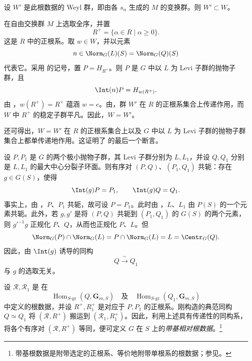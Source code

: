 
设 \(W'\) 是此根数据的 Weyl 群，即由各 \(s_\alpha\) 生成的 \(M\) 的变换群。则 \(W'\subset W\)。

在自由交换群 \(M\) 上选取全序，并置
\[
 R^+=\{\alpha\in R\mid\alpha\geq0\}.
\]
这是 \(R\) 中的正根系。取 \(w\in W\)，并以元素
\[
 n\in\Norm_G(L)(S)=\Norm_G(Q)(S)
\]
代表它。采用  的记号，置 \(P=H_{R^+}\)。则 \(P\) 是 \(G\) 中以 \(L\) 为 Levi 子群的抛物子群，且
\[
 \Int(n)P=H_{w(R^+)}.
\]
由 ，\(w(R^+)=R^+\) 蕴涵 \(w=e\)。由，群 \(W'\) 在 \(R\) 的正根系集合上传递作用，而 \(W\) 中 \(R^+\) 的稳定子群平凡。因此，\(W=W'\)。

还可得出，\(W=W'\) 在 \(R\) 的正根系集合上以及 \(G\) 中以 \(L\) 为 Levi 子群的抛物子群集合上都单传递地作用。这证明了  的最后一个断言。
\SGAQED



设 \(P,P_1\) 是 \(G\) 的两个极小抛物子群，其 Levi 子群分别为 \(L,L_1\)，并设 \(Q,Q_1\) 分别是 \(L,L_1\) 的最大中心分裂子环面。则有序对 \((P,Q)\)、\((P_1,Q_1)\) 共轭：存在 \(g\in G(S)\)，使得
\[
 \Int(g)P=P_1,\qquad \Int(g)Q=Q_1.
\]
事实上，由 ，\(P\)、\(P_1\) 共轭，故可设 \(P=P_1\)。此时由 ，\(L\)、\(L_1\) 由 \(P(S)\) 的一个元素共轭。此外，若 \(g,g'\) 是将 \((P,Q)\) 共轭到 \((P_1,Q_1)\) 的 \(G(S)\) 的两个元素，则 \(g'^{-1}g\) 正规化 \(P\)、\(Q\)，从而也正规化 \(P\)、\(L\)。但
\[
 \Norm_G(P)\cap\Norm_G(L)
 =P\cap\Norm_G(L)
 =L
 =\Centr_G(Q).
\]
因此，由 \(\Int(g)\) 诱导的同构
\[
 Q\xrightarrow{\ \sim\ }Q_1
\]
与 \(g\) 的选取无关。

设 \(\mathcal R,\mathcal R_1\) 是  在
\[
 \operatorname{Hom}_{S\text{-}\mathrm{gr}}(Q,\mathbf G_{m,S})
 \quad\text{及}\quad
 \operatorname{Hom}_{S\text{-}\mathrm{gr}}(Q_1,\mathbf G_{m,S})
\]
中定义的根数据，并设 \(R^+,R_1^+\) 是对应于 \(P,P_1\) 的正根系。刚构造的典范同构 \(Q\simeq Q_1\) 将 \((\mathcal R,R^+)\) 搬运到 \((\mathcal R_1,R_1^+)\)。因此，利用上述具有传递性的同构系，将各个有序对 \((\mathcal R,R^+)\) 等同，便可定义 \(G\) 在 \(S\) 上的\emph{带基相对根数据}。\footnote{带基根数据是附带选定的正根系、等价地附带单根系的根数据；参见。}

